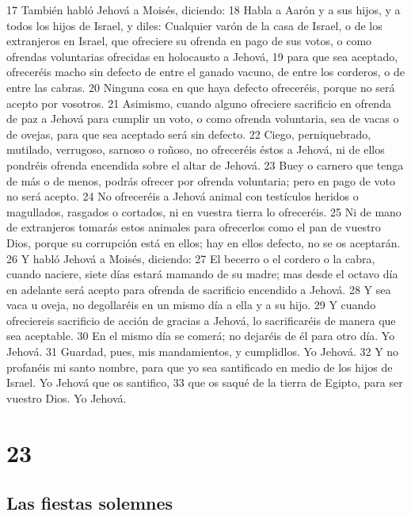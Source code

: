 17 También habló Jehová a Moisés, diciendo:
18 Habla a Aarón y a sus hijos, y a todos los hijos de Israel, y diles: Cualquier varón de la casa de Israel, o de los extranjeros en Israel, que ofreciere su ofrenda en pago de sus votos, o como ofrendas voluntarias ofrecidas en holocausto a Jehová,
19 para que sea aceptado, ofreceréis macho sin defecto de entre el ganado vacuno, de entre los corderos, o de entre las cabras.
20 Ninguna cosa en que haya defecto ofreceréis, porque no será acepto por vosotros.
21 Asimismo, cuando alguno ofreciere sacrificio en ofrenda de paz a Jehová para cumplir un voto, o como ofrenda voluntaria, sea de vacas o de ovejas, para que sea aceptado será sin defecto.
22 Ciego, perniquebrado, mutilado, verrugoso, sarnoso o roñoso, no ofreceréis éstos a Jehová, ni de ellos pondréis ofrenda encendida sobre el altar de Jehová.
23 Buey o carnero que tenga de más o de menos, podrás ofrecer por ofrenda voluntaria; pero en pago de voto no será acepto.
24 No ofreceréis a Jehová animal con testículos heridos o magullados, rasgados o cortados, ni en vuestra tierra lo ofreceréis.
25 Ni de mano de extranjeros tomarás estos animales para ofrecerlos como el pan de vuestro Dios, porque su corrupción está en ellos; hay en ellos defecto, no se os aceptarán.
26 Y habló Jehová a Moisés, diciendo:
27 El becerro o el cordero o la cabra, cuando naciere, siete días estará mamando de su madre; mas desde el octavo día en adelante será acepto para ofrenda de sacrificio encendido a Jehová.
28 Y sea vaca u oveja, no degollaréis en un mismo día a ella y a su hijo.
29 Y cuando ofreciereis sacrificio de acción de gracias a Jehová, lo sacrificaréis de manera que sea aceptable.
30 En el mismo día se comerá; no dejaréis de él para otro día. Yo Jehová.
31 Guardad, pues, mis mandamientos, y cumplidlos. Yo Jehová.
32 Y no profanéis mi santo nombre, para que yo sea santificado en medio de los hijos de Israel. Yo Jehová que os santifico,
33 que os saqué de la tierra de Egipto, para ser vuestro Dios. Yo Jehová.  

\chapter{23}

\section{Las fiestas solemnes}

